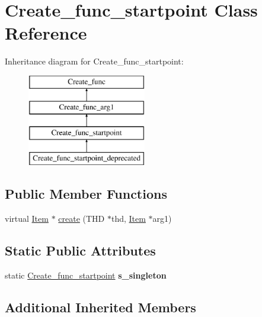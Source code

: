 \hypertarget{classCreate__func__startpoint}{}\section{Create\+\_\+func\+\_\+startpoint Class Reference}
\label{classCreate__func__startpoint}
Inheritance diagram for Create\+\_\+func\+\_\+startpoint\+:\begin{figure}[H]
\begin{center}
\leavevmode
\includegraphics[height=4.000000cm]{classCreate__func__startpoint}
\end{center}
\end{figure}
\subsection*{Public Member Functions}
\begin{DoxyCompactItemize}
\item 
virtual \mbox{\hyperlink{classItem}{Item}} $\ast$ \mbox{\hyperlink{classCreate__func__startpoint_ae7588448bfe733247410bb191dedc5d6}{create}} (T\+HD $\ast$thd, \mbox{\hyperlink{classItem}{Item}} $\ast$arg1)
\end{DoxyCompactItemize}
\subsection*{Static Public Attributes}
\begin{DoxyCompactItemize}
\item 
\mbox{\label{classCreate__func__startpoint_a16518fb8e0c5171cb90711488bdd72c0}} 
static \mbox{\hyperlink{classCreate__func__startpoint}{Create\+\_\+func\+\_\+startpoint}} {\bfseries s\+\_\+singleton}
\end{DoxyCompactItemize}
\subsection*{Additional Inherited Members}


